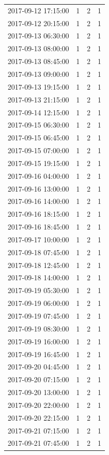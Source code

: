 \begin{tabular}{lrrr}
2017-09-12 17:15:00 & 1 & 2 & 1 \\
2017-09-12 20:15:00 & 1 & 2 & 1 \\
2017-09-13 06:30:00 & 1 & 2 & 1 \\
2017-09-13 08:00:00 & 1 & 2 & 1 \\
2017-09-13 08:45:00 & 1 & 2 & 1 \\
2017-09-13 09:00:00 & 1 & 2 & 1 \\
2017-09-13 19:15:00 & 1 & 2 & 1 \\
2017-09-13 21:15:00 & 1 & 2 & 1 \\
2017-09-14 12:15:00 & 1 & 2 & 1 \\
2017-09-15 06:30:00 & 1 & 2 & 1 \\
2017-09-15 06:45:00 & 1 & 2 & 1 \\
2017-09-15 07:00:00 & 1 & 2 & 1 \\
2017-09-15 19:15:00 & 1 & 2 & 1 \\
2017-09-16 04:00:00 & 1 & 2 & 1 \\
2017-09-16 13:00:00 & 1 & 2 & 1 \\
2017-09-16 14:00:00 & 1 & 2 & 1 \\
2017-09-16 18:15:00 & 1 & 2 & 1 \\
2017-09-16 18:45:00 & 1 & 2 & 1 \\
2017-09-17 10:00:00 & 1 & 2 & 1 \\
2017-09-18 07:45:00 & 1 & 2 & 1 \\
2017-09-18 12:45:00 & 1 & 2 & 1 \\
2017-09-18 14:00:00 & 1 & 2 & 1 \\
2017-09-19 05:30:00 & 1 & 2 & 1 \\
2017-09-19 06:00:00 & 1 & 2 & 1 \\
2017-09-19 07:45:00 & 1 & 2 & 1 \\
2017-09-19 08:30:00 & 1 & 2 & 1 \\
2017-09-19 16:00:00 & 1 & 2 & 1 \\
2017-09-19 16:45:00 & 1 & 2 & 1 \\
2017-09-20 04:45:00 & 1 & 2 & 1 \\
2017-09-20 07:15:00 & 1 & 2 & 1 \\
2017-09-20 13:00:00 & 1 & 2 & 1 \\
2017-09-20 22:00:00 & 1 & 2 & 1 \\
2017-09-20 22:15:00 & 1 & 2 & 1 \\
2017-09-21 07:15:00 & 1 & 2 & 1 \\
2017-09-21 07:45:00 & 1 & 2 & 1 \\

\end{tabular}
